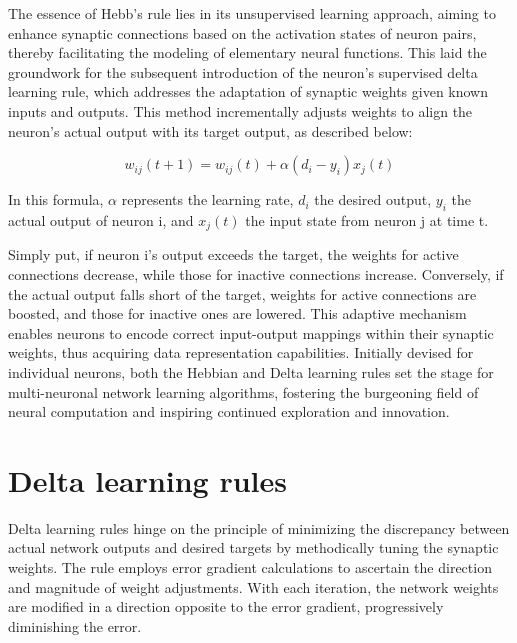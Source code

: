 \documentclass[12pt,a4paper]{report}
\begin{document}
The essence of Hebb's rule lies in its unsupervised learning approach, aiming to enhance synaptic connections based on the activation states of neuron pairs, thereby facilitating the modeling of elementary neural functions. This laid the groundwork for the subsequent introduction of the neuron's supervised delta learning rule, which addresses the adaptation of synaptic weights given known inputs and outputs. This method incrementally adjusts weights to align the neuron's actual output with its target output, as described below:

\begin{equation}
    w_{ij}(t + 1) = w_{ij}(t) + \alpha(d_i - y_i)x_j(t)
\end{equation}

In this formula, $\alpha$ represents the learning rate, $d_i$ the desired output, $y_i$ the actual output of neuron i, and $x_j(t)$ the input state from neuron j at time t.

Simply put, if neuron i's output exceeds the target, the weights for active connections decrease, while those for inactive connections increase. Conversely, if the actual output falls short of the target, weights for active connections are boosted, and those for inactive ones are lowered. This adaptive mechanism enables neurons to encode correct input-output mappings within their synaptic weights, thus acquiring data representation capabilities. Initially devised for individual neurons, both the Hebbian and Delta learning rules set the stage for multi-neuronal network learning algorithms, fostering the burgeoning field of neural computation and inspiring continued exploration and innovation.

\section{Delta learning rules}

Delta learning rules hinge on the principle of minimizing the discrepancy between actual network outputs and desired targets by methodically tuning the synaptic weights. The rule employs error gradient calculations to ascertain the direction and magnitude of weight adjustments. With each iteration, the network weights are modified in a direction opposite to the error gradient, progressively diminishing the error.
\end{document}
